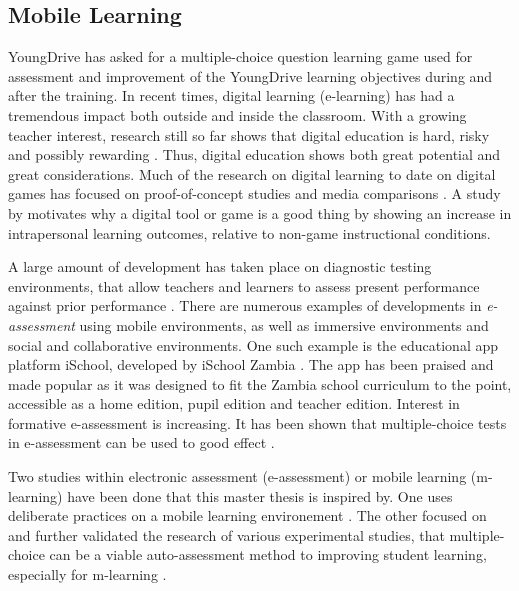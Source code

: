 \subsection{Mobile Learning}

    YoungDrive has asked for a multiple-choice question learning game used for assessment and improvement of the YoungDrive learning objectives during and after the training. In recent times, digital learning (e-learning) has had a tremendous impact both outside and inside the classroom. With a growing teacher interest, research still so far shows that digital education is hard, risky and possibly rewarding \citep{luckin}. Thus, digital education shows both great potential and great considerations. Much of the research on digital learning to date on digital games has focused on proof-of-concept studies and media comparisons \citep{luckin}. A study by \cite{gates} motivates why a digital tool or game is a good thing by showing an increase in intrapersonal learning outcomes, relative to non-game instructional conditions.


    A large amount of development has taken place on diagnostic testing environments, that allow teachers and learners to assess present performance against prior performance \citep{luckin}. There are numerous examples of developments in \textit{e-assessment} using mobile environments, as well as immersive environments and social and collaborative environments. One such example is the educational app platform iSchool, developed by iSchool Zambia \citep{ischool}. The app has been praised and made popular as it was designed to fit the Zambia school curriculum to the point, accessible as a home edition, pupil edition and teacher edition. Interest in formative e-assessment is increasing.  It has been shown that multiple-choice tests in e-assessment can be used to good effect \citep{nicol}.

    Two studies within electronic assessment (e-assessment) or mobile learning (m-learning) have been done that this master thesis is inspired by. One uses deliberate practices on a mobile learning environement \citep{yengin}. The other focused on and further validated the research of various experimental studies, that multiple-choice can be a viable auto-assessment method to improving student learning, especially for m-learning \citep{de-marcos}.

